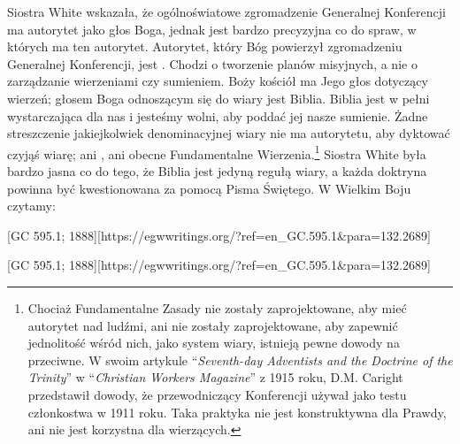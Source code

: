 Siostra White wskazała, że ogólnoświatowe zgromadzenie Generalnej Konferencji ma autorytet jako głos Boga, jednak jest bardzo precyzyjna co do spraw, w których ma ten autorytet. Autorytet, który Bóg powierzył zgromadzeniu Generalnej Konferencji, jest . Chodzi o tworzenie planów misyjnych, a nie o zarządzanie wierzeniami czy sumieniem. Boży kościół ma Jego głos dotyczący wierzeń; głosem Boga odnoszącym się do wiary jest Biblia. Biblia jest w pełni wystarczająca dla nas i jesteśmy wolni, aby poddać jej nasze sumienie. Żadne streszczenie jakiejkolwiek denominacyjnej wiary nie ma autorytetu, aby dyktować czyjąś wiarę; ani , ani obecne Fundamentalne Wierzenia.\footnote{Chociaż Fundamentalne Zasady nie zostały zaprojektowane, aby mieć autorytet nad ludźmi, ani nie zostały zaprojektowane, aby zapewnić jednolitość wśród nich, jako system wiary, istnieją pewne dowody na przeciwne. W swoim artykule “\textit{Seventh-day Adventists and the Doctrine of the Trinity}” w “\textit{Christian Workers Magazine}” z 1915 roku, D.M. Caright przedstawił dowody, że przewodniczący Konferencji używał  jako testu członkostwa w 1911 roku. Taka praktyka nie jest konstruktywna dla Prawdy, ani nie jest korzystna dla wierzących.} Siostra White była bardzo jasna co do tego, że Biblia jest jedyną regułą wiary, a każda doktryna powinna być kwestionowana za pomocą Pisma Świętego. W Wielkim Boju czytamy:


[GC 595.1; 1888][https://egwwritings.org/?ref=en\_GC.595.1&para=132.2689]


[GC 595.1; 1888][https://egwwritings.org/?ref=en\_GC.595.1&para=132.2689]


